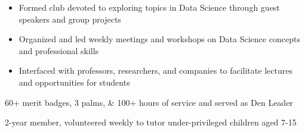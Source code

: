 \documentclass[10pt, letterpaper]{awesome-cv}
\begin{document}
\begin{skills}
    {\vspace*{-2.5ex}
    \begin{itemize}[noitemsep, label=\bullet]
        \item Formed club devoted to exploring topics in Data Science through guest speakers and group projects
        \item Organized and led weekly meetings and workshops on Data Science concepts and professional skills
        \item Interfaced with professors, researchers, and companies to facilitate lectures and opportunities for students
    \end{itemize}
    \vspace*{-3.5ex}}
    
    
    
    
    {60+ merit badges, 3 palms, \& 100+ hours of service and served as Den Leader}
    
    {2-year member, volunteered weekly to tutor under-privileged children aged 7-15}
\end{skills}
\end{document}
